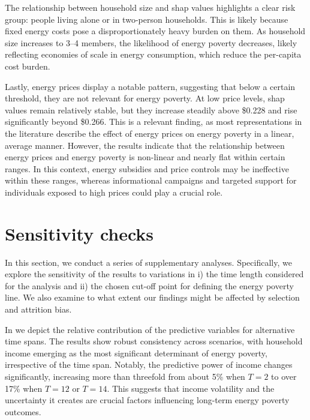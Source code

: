 \documentclass[preprint,authoryear,12pt]{elsarticle}
\begin{document}
The relationship between household size and \Gls{shap} values highlights a clear risk group: people living alone or in two-person households. This is likely because fixed energy costs pose a disproportionately heavy burden on them. As household size increases to 3--4 members, the likelihood of energy poverty decreases, likely reflecting economies of scale in energy consumption, which reduce the per-capita cost burden.

Lastly, energy prices display a notable pattern, suggesting that below a certain threshold, they are not relevant for energy poverty. At low price levels, \Gls{shap} values remain relatively stable, but they increase steadily above \$0.228 and rise significantly beyond \$0.266. This is a relevant finding, as most representations in the literature describe the effect of energy prices on energy poverty in a linear, average manner. However, the results indicate that the relationship between energy prices and energy poverty is non-linear and nearly flat within certain ranges. In this context, energy subsidies and price controls may be ineffective within these ranges, whereas informational campaigns and targeted support for individuals exposed to high prices could play a crucial role. 


\section{Sensitivity checks} \label{Sensitivity_checks}

In this section, we conduct a series of supplementary analyses. Specifically, we explore the sensitivity of the results to variations in i) the time length considered for the analysis and ii) the chosen cut-off point for defining the energy poverty line. We also examine to what extent our findings might be affected by selection and attrition bias. 

In  we depict the relative contribution of the predictive variables for alternative time spans. The results show robust consistency across scenarios, with household income emerging as the most significant determinant of energy poverty, irrespective of the time span. Notably, the predictive power of income changes significantly, increasing more than threefold from about 5\% when $T=2$ to over 17\% when $T=12$ or $T=14$. This suggests that income volatility and the uncertainty it creates are crucial factors influencing long-term energy poverty outcomes. 
\end{document}
